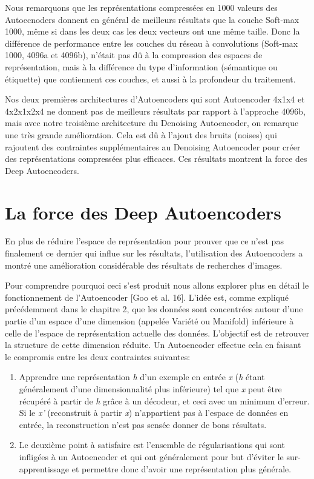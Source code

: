 	Nous remarquons que les représentations compressées en 1000 valeurs des Autoecnoders donnent en général de meilleurs résultats que la couche Soft-max 1000, même si dans les deux cas les deux vecteurs ont une même taille. Donc la différence de performance entre les couches du réseau à convolutions (Soft-max 1000, 4096a et 4096b), n’était pas dû à la compression des espaces de représentation, mais à la différence du type d'information (sémantique ou étiquette) que contiennent ces couches, et aussi à la profondeur du traitement.
	
	Nos deux premières architectures d'Autoencoders qui sont Autoencoder 4x1x4 et 4x2x1x2x4 ne donnent pas de meilleurs résultats par rapport à l'approche 4096b, mais avec notre troisième architecture du Denoising Autoencoder, on remarque une très grande amélioration. Cela est dû à l'ajout des bruits (noises) qui rajoutent des contraintes supplémentaires au Denoising Autoencoder pour créer des représentations compressées plus efficaces. Ces résultats montrent la force des Deep Autoencoders.


\section{La force des Deep Autoencoders}
	En plus de réduire l'espace de représentation pour prouver que ce n'est pas finalement ce dernier qui influe sur les résultats, l'utilisation des Autoencoders a montré une amélioration considérable des résultats de recherches d'images.

	Pour comprendre pourquoi ceci s'est produit nous allons explorer plus en détail le fonctionnement de l'Autoencoder [Goo et al. 16]. L’idée est, comme expliqué précédemment dans le chapitre 2, que les données sont concentrées autour d'une partie d'un espace d'une dimension (appelée Variété ou Manifold) inférieure à celle de l'espace de représentation actuelle des données. L'objectif est de retrouver la structure de cette dimension réduite. Un Autoencoder effectue cela en faisant le compromis entre les deux contraintes suivantes:

\begin{enumerate}[i]
\item Apprendre une représentation \textit{h} d'un exemple en entrée \textit{x} (\textit{h} étant généralement d'une dimensionnalité plus inférieure) tel que \textit{x} peut être récupéré à partir de \textit{h} grâce à un décodeur, et ceci avec un minimum d'erreur. Si le \textit{x'} (reconstruit à partir \textit{x}) n'appartient pas à l'espace de données en entrée, la reconstruction n'est pas sensée donner de bons résultats.

\item Le deuxième point à satisfaire est l'ensemble de régularisations qui sont infligées à un Autoencoder et qui ont généralement pour but d’éviter le sur-apprentissage et permettre donc d'avoir une représentation plus générale.

\end{enumerate}


